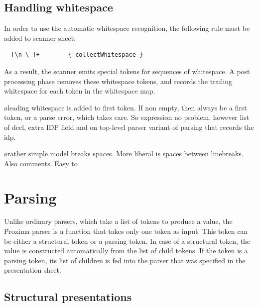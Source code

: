 \documentclass[12pt]{article}
\begin{document}
\subsection{Handling whitespace}

In order to use the automatic whitespace recognition, the following rule must be added to scanner sheet:

\begin{footnotesize}
\begin{verbatim}
  [\n \ ]+        { collectWhitespace }
\end{verbatim} %
\end{footnotesize}

As a result, the scanner emits special tokens for sequences of whitespace. A post processing phase removes these whitespace tokens, and records the trailing whitespace for each token in the whitespace map. 

\bl
\o leading whitespace is added to first token. If non empty, then always be a first token, or a parse error, which takes care. So expression no problem. however list of decl, extra IDP field and on top-level parser variant of parsing that records the idp.
\el

\bl
\o rather simple model breaks spaces. More liberal is spaces between linebreaks. Also comments. Easy to 
\el








%
\section{Parsing}\label{sect:parser}
%

Unlike ordinary parsers, which take a list of tokens to produce a value, the Proxima parser is a function that takes only one token as input. This token can be either a structural token or a parsing token. In case of a structural token, the value is constructed automatically from the list of child tokens. If the token is a parsing token, its list of children is fed into the parser that was specified in the presentation sheet.

\subsection{Structural presentations}\label{subsect:parsingStructural}
\end{document}
